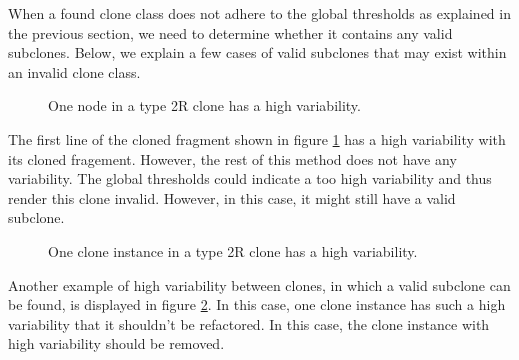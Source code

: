 When a found clone class does not adhere to the global thresholds as explained in the previous section, we need to determine whether it contains any valid subclones. Below, we explain a few cases of valid subclones that may exist within an invalid clone class.

\begin{figure}[H]
\begin{parcolumns}{2}
\end{parcolumns}
\caption{One node in a type 2R clone has a high variability.}
\label{fig:2rvariabilityhigh1}
\end{figure}

The first line of the cloned fragment shown in figure \ref{fig:2rvariabilityhigh1} has a high variability with its cloned fragement. However, the rest of this method does not have any variability. The global thresholds could indicate a too high variability and thus render this clone invalid. However, in this case, it might still have a valid subclone.

\begin{figure}[H]
\begin{parcolumns}{3}
\end{parcolumns}
\caption{One clone instance in a type 2R clone has a high variability.}
\label{fig:2rvariabilityhigh2}
\end{figure}

Another example of high variability between clones, in which a valid subclone can be found, is displayed in figure \ref{fig:2rvariabilityhigh2}. In this case, one clone instance has such a high variability that it shouldn't be refactored. In this case, the clone instance with high variability should be removed.

